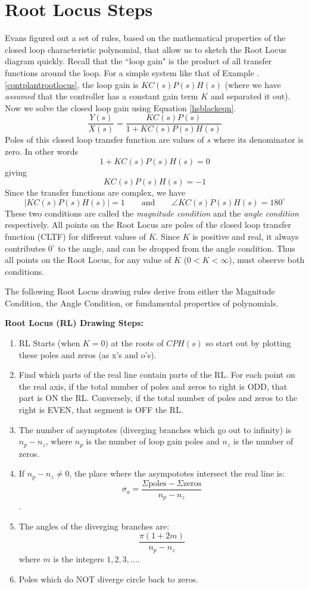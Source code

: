\section{Root Locus Steps}

Evans figured out a set of rules, based on the mathematical properties of the closed loop characteristic polynomial, that allow us to sketch the Root Locus diagram quickly.
Recall that the ``loop gain" is the product of all transfer functions around the loop.  For a simple system like that of Example \thechapter.\ref{contplantrootlocus}, the loop gain is $KC(s)P(s)H(s)$ (where we have {\it assumed} that the controller has a constant gain term $K$ and separated it out).  Now we solve the closed loop gain using Equation \ref{hsblackeqn}.
\[
\frac{Y(s)}{X(s)} = \frac  {KC(s)P(s)}   {1+KC(s)P(s)H(s)}
\]
Poles of this closed loop transfer function are values of $s$ where its denominator is zero.  In other words
\[
 {1+KC(s)P(s)H(s)} = 0  
\]
giving
\[
{KC(s)P(s)H(s)} = -1
\]
Since the transfer functions are complex, we have
\[
\left | KC(s)P(s)H(s)\right | = 1 \qquad \mathrm{and} \qquad \angle KC(s)P(s)H(s) = 180^\circ
\]
These two conditions are called the {\it magnitude condition} and the {\it angle condition} respectively.
All points on the Root Locus are poles of the closed loop transfer function (CLTF) for different values of $K$.  Since $K$ is positive and real, it always contributes $0^\circ$ to the angle, and can be dropped from the angle condition.  Thus all points on the Root Locus, for any value of $K$ ($0<K<\infty$), must observe both conditions.

The following Root Locus drawing rules derive from either the Magnitude Condition, the Angle Condition, or fundamental properties of polynomials.



{\bf Root Locus (RL) Drawing Steps:}	%
\begin{enumerate}
  \item RL Starts (when $K=0$) at the roots of $CPH(s)$ so start out by  plotting these poles and zeros (as x's and o's).
  \item Find which parts of the real line contain parts of the RL.  For each point on the real axis, if the total number of poles and zeros to right is ODD, that part is ON the RL. Conversely, if the total number of poles and zeros to the right is EVEN, that segment is OFF the RL. 
  \item The number of asymptotes (diverging branches which go out to infinity)  is $n_p-n_z$, where $n_p$ is the number of loop gain poles and $n_z$ is the number of zeros.
  \item If $n_p-n_z \neq 0$, the place where the asympototes intersect the real line is:
 $$
 \sigma_a = \frac{\Sigma\mathrm{poles}- \Sigma\mathrm{zeros}}{n_p-n_z}
 $$.

 \item The angles of the diverging branches are:
 $$
 \frac{\pi(1+2m)}{n_p-n_z}
 $$
 where $m$ is the integers $1, 2 , 3, \dots$. 
  \item Poles which do NOT diverge circle back to zeros.
\end{enumerate}


